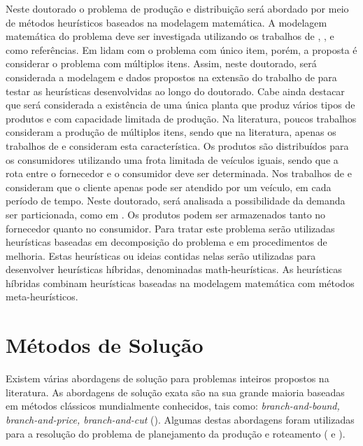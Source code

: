 \documentclass[11pt]{article}
\begin{document}
Neste doutorado o problema de produção e distribuição será abordado por meio de métodos heurísticos baseados na modelagem matemática. A modelagem matemática do problema deve ser investigada utilizando os trabalhos de  , ,  e  como referências. Em  lidam com o problema com único item, porém, a proposta é considerar o problema com múltiplos itens. Assim, neste doutorado, será considerada a modelagem e dados propostos na extensão do trabalho de  para testar as heurísticas desenvolvidas ao longo do doutorado.  Cabe ainda destacar que será considerada a existência de uma única planta que produz vários tipos de produtos e com capacidade limitada de produção. Na literatura, poucos trabalhos consideram a produção de múltiplos itens, sendo que na literatura, apenas os trabalhos de  e  consideram esta característica. Os produtos são distribuídos para os consumidores utilizando uma frota limitada de veículos iguais,  sendo que a rota entre o fornecedor e o consumidor deve ser determinada. Nos trabalhos de  e  consideram que o cliente apenas pode ser atendido por um veículo, em cada período de tempo. Neste doutorado, será analisada a possibilidade da demanda ser particionada, como em . Os produtos podem ser armazenados tanto no fornecedor quanto no consumidor.  Para tratar este problema serão utilizadas heurísticas baseadas em decomposição do problema e em procedimentos de melhoria. Estas heurísticas ou ideias contidas nelas serão utilizadas para desenvolver heurísticas híbridas, denominadas math-heurísticas. As heurísticas híbridas combinam heurísticas baseadas na modelagem matemática com métodos meta-heurísticos. 

\section{Métodos de Solução}\label{sec:03}

Existem várias abordagens de solução para problemas inteiros propostos na literatura. As abordagens de solução exata são na sua grande maioria baseadas em métodos clássicos mundialmente conhecidos, tais como: \textit{branch-and-bound, branch-and-price, branch-and-cut} (). Algumas destas abordagens foram utilizadas para a resolução do problema de planejamento da produção e roteamento ( e ). 
\end{document}
